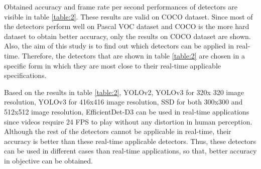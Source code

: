 \documentclass{article}
\begin{document}
\setlength{\parindent}{6ex}

\indent

Obtained accuracy and frame rate per second performances of detectors are visible 
in table \ref{table:2}. These results are valid on COCO dataset. 
Since most of the detectors perform well on Pascal VOC dataset and COCO is the more hard 
dataset to obtain better accuracy, only the results on COCO dataset are shown. Also, 
the aim of this study is to find out which detectors can be applied in real-time. 
Therefore, the detectors that are shown in table \ref{table:2} 
are chosen in a specific form in which they are most close to their real-time 
applicable specifications. \par

Based on the results in table \ref{table:2}, YOLOv2, YOLOv3 for 320x
320 image resolution, YOLOv3 for 416x416 image resolution, SSD for both 300x300 and 
512x512 image resolution, EfficientDet-D3 can be used in real-time applications since 
videos require 24 FPS to play without any distortion in human perception. Although 
the rest of the detectors cannot be applicable in real-time, their accuracy is better 
than these real-time applicable detectors. Thus, these detectors can be used in 
different cases than real-time applications, so that, better accuracy in objective 
can be obtained. 
\end{document}
